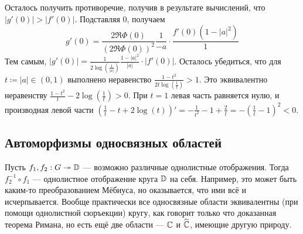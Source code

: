 \documentclass[a4paper]{report}
\begin{document}
{{{                \item Осталось получить противоречие, получив в результате вычислений, что $|g'(0)| > |f'(0)|$.
                Подставляя $0$, получаем
                \[g'(0) = \frac{2\Re\Phi(0)}{(2\Re\Phi(0))^2}\frac{1}{-a} \cdot \frac{f'(0)(1 - |a|^2)}{1}\]
                Тем самым, $|g'(0)| = \frac{1}{2 \log\left(\frac{1}{|a|}\right)}\frac{1 - |a|^2}{|a|} \cdot |f'(0)|$.
                Осталось убедиться, что для $t \coloneqq |a| \in (0, 1)$ выполнено неравенство $\frac{1 - t^2}{2t \log\left(\frac{1}{t}\right)} > 1$.
                Это эквивалентно неравенству $\frac{1 - t^2}{t} - 2\log\left(\frac{1}{t}\right) > 0$.
                При $t = 1$ левая часть равняется нулю, и производная левой части $\left(\frac{1}{t} - t + 2\log\left(t\right)\right)' = -\frac{1}{t^2} - 1 + \frac{2}{t} = -\left(\frac{1}{t} - 1\right)^2 < 0$.\qedhere
            }
        }
    }
    \subsection{Автоморфизмы односвязных областей}
    Пусть $f_1, f_2: G \twoheadrightarrow \mathbb{D}$ --- возможно различные однолистные отображения.
    Тогда $f_2^{-1} \circ f_1$ --- однолистное отображение круга $\mathbb{D}$ на себя.
    Например, это может быть каким-то преобразованием Мёбиуса, но оказывается, что ими всё и исчерпывается.
    Вообще практически все односвязные области эквивалентны (при помощи однолистной сюръекции) кругу, как говорит только что доказанная теорема Римана, но есть ещё две области --- $\mathbb{C}$ и $\widehat{\mathbb{C}}$, имеющие другую природу.
\end{document}

